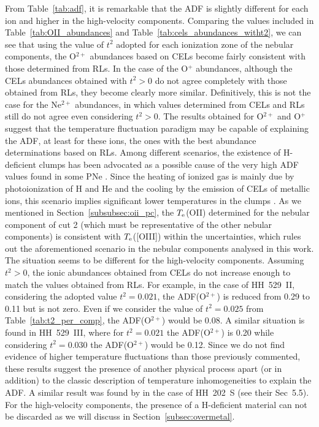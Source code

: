 \documentclass[fleqn,usenatbib]{mnras}
\begin{document}
From Table~\ref{tab:adf}, it is remarkable that the ADF is slightly different for each ion and higher in the high-velocity components. Comparing the values included in Table~\ref{tab:OII_abundances} and Table~\ref{tab:cels_abundances_witht2}, we can see that using the value of $t^2$ adopted for each ionization zone of the nebular components, the O$^{2+}$ abundances based on CELs become fairly consistent with those determined from RLs. In the case of the O$^+$ abundances, although the CELs abundances obtained with $t^2>0$ do not agree completely with those obtained from RLs, they become clearly more similar. Definitively, this is not the case for the Ne$^{2+}$ abundances, in which values determined from CELs and RLs still do not agree even considering  $t^2>0$. The results obtained for O$^{2+}$ and O$^{+}$ suggest that the temperature fluctuation paradigm may be capable of explaining the ADF, at least for these ions, the ones with the best abundance  determinations based on RLs. Among different scenarios, the existence of  H-deficient clumps has been advocated as a possible cause of the very high ADF values found in some PNe \citep[e.g][]{pequignot02}. Since the heating of ionized gas is mainly due by photoionization of H and He and the cooling by the emission of CELs of metallic ions, this scenario implies significant lower temperatures in the clumps \citep{pequignot02}. As we mentioned in Section~\ref{subsubsec:oii_pc}, the $T_{\rm e}$(O\thinspace II) determined for the nebular component of cut 2 (which must be representative of the other nebular components) is consistent with $T_{\rm e}$([O\thinspace III]) within the uncertainties, which rules out the aforementioned scenario in the nebular components analysed in this work.  
The situation seems to be different for the high-velocity components. Assuming $t^2>0$, the ionic abundances obtained from CELs do not increase enough to match the values obtained from RLs. For example, in the case of HH~529~II, considering the adopted value $t^2=0.021$, the ADF(O$^{2+}$) is reduced from 0.29 to 0.11 but is not zero. Even if we consider the value of $t^2=0.025$ from Table~\ref{tab:t2_per_comp}, the ADF(O$^{2+}$) would be 0.08. A similar situation is found in HH~529~III, where for $t^2=0.021$ the ADF(O$^{2+}$) is 0.20 while considering $t^2=0.030$ the ADF(O$^{2+}$) would be 0.12. Since we do not find evidence of higher temperature fluctuations than those previously commented, these results suggest the presence of another physical process apart (or in addition) to the classic description of temperature inhomogeneities to explain the ADF. A similar result was found by \citet{mesadelgado09} in the case of HH~202~S (see their Sec~5.5). For the high-velocity components, the presence of a H-deficient material can not be discarded as we will discuss in Section~\ref{subsec:overmetal}. 
\end{document}
